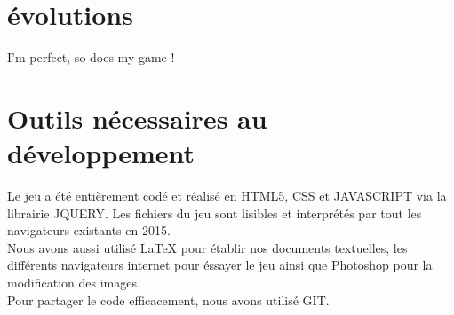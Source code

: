 \documentclass{article}
\begin{document}
\newpage
\section{évolutions}

I'm perfect, so does my game !

\newpage
\section{Outils nécessaires au développement}

\hspace*{0.6cm}Le jeu a été entièrement codé et réalisé en HTML5, CSS et JAVASCRIPT via la librairie JQUERY. Les fichiers du jeu sont lisibles et interprétés par tout les navigateurs existants en 2015.\\
\hspace*{0.6cm}Nous avons aussi utilisé LaTeX pour établir nos documents textuelles, les différents navigateurs internet pour éssayer le jeu ainsi que Photoshop pour la modification des images.\\
Pour partager le code efficacement, nous avons utilisé GIT.
\end{document}
